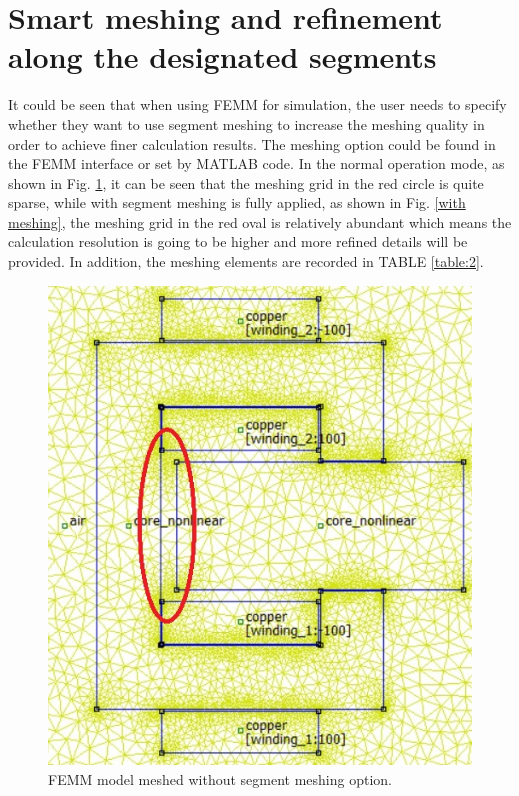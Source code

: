 \documentclass[a4paper]{IEEEtran}
\begin{document}
{\section{Smart meshing and refinement along the designated segments}
It could be seen that when using FEMM for simulation, the user needs to specify whether they want to use
segment meshing to increase the meshing quality in order to achieve finer calculation results.
The meshing option could be found in the FEMM interface or set by MATLAB code. In the normal operation mode, as shown in Fig. \ref{without meshing},
it can be seen that the meshing grid in the red circle is quite sparse, while with segment meshing is fully applied, as shown in Fig. \ref{with meshing},
the meshing grid in the red oval is relatively abundant which means the calculation resolution is going to be higher and more refined
details will be provided. In addition, the meshing elements are recorded in TABLE \ref{table:2}.
\begin{figure}[H]
\begin{centering}
\includegraphics[scale=0.5]{mesh_without_segment_meshing.jpg} 
\par\end{centering}   
\caption{FEMM model meshed without segment meshing option.\label{without meshing}}
\end{figure} 

}
\end{document}
